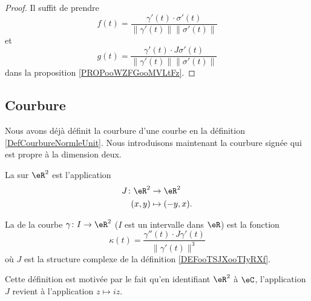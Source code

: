 \begin{proof}
    Il suffit de prendre
    \begin{equation}
        f(t)=\frac{ \gamma'(t)\cdot\sigma'(t) }{ \| \gamma'(t) \|\| \sigma'(t) \| }
    \end{equation}
    et
    \begin{equation}
        g(t)=\frac{ \gamma'(t)\cdot J\sigma'(t) }{ \| \gamma'(t) \|\| \sigma'(t) \| }
    \end{equation}
    dans la proposition \ref{PROPooWZFGooMVLtFz}.
\end{proof}

\subsection{Courbure}

Nous avons déjà définit la courbure d'une courbe en la définition \ref{DefCourbureNormleUnit}. Nous introduisons maintenant la courbure signée qui est propre à la dimension deux.

\begin{definition}      \label{DEFooTSJXooTIyRXf}
    La  sur \( \eR^2\) est l'application
    \begin{equation}
        \begin{aligned}
            J\colon \eR^2&\to \eR^2 \\
            (x,y)&\mapsto (-y,x). 
        \end{aligned}
    \end{equation}
\end{definition}

\begin{definition}      \label{DEFooJFWEooXcIVUs}
    La  de la courbe \( \gamma\colon I\to \eR^2\) (\( I\) est un intervalle dans \( \eR\)) est la fonction
    \begin{equation}        \label{EQooWOUQooXrVzGx}
        \kappa(t)=\frac{ \gamma''(t)\cdot J\gamma'(t) }{ \| \gamma'(t) \|^3 }
    \end{equation}
    où \( J\) est la structure complexe de la définition \ref{DEFooTSJXooTIyRXf}.
\end{definition}
Cette définition est motivée par le fait qu'en identifiant \( \eR^2\) à \( \eC\), l'application \( J\) revient à l'application \( z\mapsto iz\).


